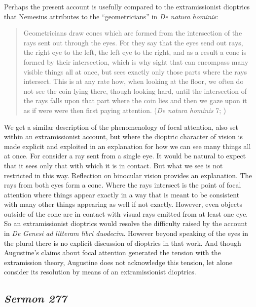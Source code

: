 \documentclass[12pt]{article}
\begin{document}
Perhaps the present account is usefully compared to the extramissionist dioptrics that Nemesius attributes to the ``geometricians'' in \emph{De natura hominis}:
\begin{quote}
	Geometricians draw cones which are formed from the intersection of the rays sent out through the eyes. For they say that the eyes send out rays, the right eye to the left, the left eye to the right, and as a result a cone is formed by their intersection, which is why sight that can encompass many visible things all at once, but sees exactly only those parts where the rays intersect. This is at any rate how, when looking at the floor, we often do not see the coin lying there, though looking hard, until the intersection of the rays falls upon that part where the coin lies and then we gaze upon it as if were were then first paying attention. (\emph{De natura hominis} 7; \citealt[104--105]{Sharples:2008aa})
\end{quote}
We get a similar description of the phenomenology of focal attention, also set within an extramissionist account, but where the dioptric character of vision is made explicit and exploited in an explanation for how we can see many things all at once. For consider a ray sent from a single eye. It would be natural to expect that it sees only that with which it is in contact. But what we see is not restricted in this way. Reflection on binocular vision provides an explanation. The rays from both eyes form a cone. Where the rays intersect is the point of focal attention where things appear exactly in a way that is meant to be consistent with many other things appearing as well if not exactly. However, even objects outside of the cone are in contact with visual rays emitted from at least one eye. So an extramissionist dioptrics would resolve the difficulty raised by the account in \emph{De Genesi ad litteram libri duodecim}. However beyond speaking of the eyes in the plural there is no explicit discussion of dioptrics in that work. And though Augustine's claims about focal attention generated the tension with the extramission theory, Augustine does not acknowledge this tension, let alone consider its resolution by means of an extramissionist dioptrics.


\subsection{\emph{Sermon 277}} %
\label{sub:sermon_277}
\end{document}
